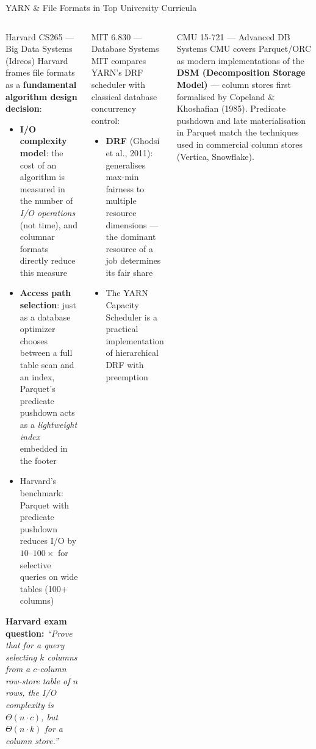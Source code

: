 \documentclass[aspectratio=169,10pt]{beamer}
\begin{document}
\begin{frame}{YARN \& File Formats in Top University Curricula}
  \begin{columns}[T]
      \begin{block}{Harvard CS265 — Big Data Systems (Idreos)}
        \small Harvard frames file formats as a \textbf{fundamental algorithm design decision}:
        \begin{itemize}
          \item \textbf{I/O complexity model}: the cost of an algorithm is measured in the number of \emph{I/O operations} (not time), and columnar formats directly reduce this measure
          \item \textbf{Access path selection}: just as a database optimizer chooses between a full table scan and an index, Parquet's predicate pushdown acts as a \emph{lightweight index} embedded in the footer
          \item Harvard's benchmark: Parquet with predicate pushdown reduces I/O by $10$--$100\times$ for selective queries on wide tables (100+ columns)
        \end{itemize}
        \textbf{Harvard exam question:} \textit{``Prove that for a query selecting $k$ columns from a $c$-column row-store table of $n$ rows, the I/O complexity is $\Theta(n \cdot c)$, but $\Theta(n \cdot k)$ for a column store.''}
      \end{block}

      \begin{exampleblock}{MIT 6.830 — Database Systems}
        \small MIT compares YARN's DRF scheduler with classical database concurrency control:
        \begin{itemize}
          \item \textbf{DRF} (Ghodsi et al., 2011): generalises max-min fairness to multiple resource dimensions — the dominant resource of a job determines its fair share
          \item The YARN Capacity Scheduler is a practical implementation of hierarchical DRF with preemption
        \end{itemize}
      \end{exampleblock}
      \vspace{4pt}
      \begin{alertblock}{CMU 15-721 — Advanced DB Systems}
        \small CMU covers Parquet/ORC as modern implementations of the \textbf{DSM (Decomposition Storage Model)} — column stores first formalised by Copeland \& Khoshafian (1985).  Predicate pushdown and late materialisation in Parquet match the techniques used in commercial column stores (Vertica, Snowflake).
      \end{alertblock}
  \end{columns}
\end{frame}
\end{document}
